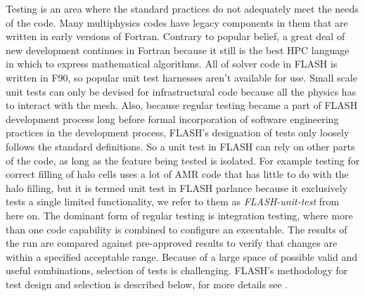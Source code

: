 Testing is an area where the standard practices do not adequately
meet the needs of the code. Many multiphysics codes have legacy
components in them that are written in early versions of
Fortran. Contrary to popular belief, a great deal of new development
continues in Fortran because it still is the best HPC language
in which to express mathematical algorithms. All of solver code in
FLASH is written in F90, so popular unit test harnesses aren't available for
use. Small scale unit tests can only be devised for infrastructural
code because all the physics has to interact with the mesh. Also,
because regular testing became a part of FLASH development process
long before formal incorporation of software engineering practices in
the development process, FLASH's designation of tests only loosely follows the
standard definitions. So a unit test in FLASH can rely on other parts
of the code, as long as the feature being tested is isolated. For
example testing for correct filling of halo cells uses a lot of AMR
code that has little to do with the halo filling, but it is termed
unit test in FLASH parlance because it exclusively tests a single
limited functionality, we refer to them as {\em FLASH-unit-test} from
here on. The dominant form of regular testing is
integration testing, where more than one code capability is combined to
configure an executable. The results of the run are compared against
pre-approved results to verify that changes are within a specified
acceptable range. Because of a large space of possible valid and
useful combinations, selection of tests is challenging. FLASH's
methodology for test design and selection is described below, for more
details see \cite{Dubey2015}.

